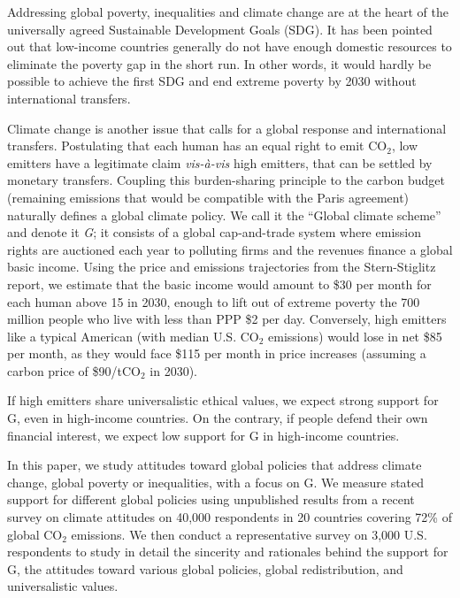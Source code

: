 \documentclass{nature}
\begin{document}
Addressing global poverty, inequalities and climate change are at the heart of the universally agreed Sustainable Development Goals (SDG). %
It has been pointed out that low-income countries generally do not have enough domestic resources to eliminate the poverty gap in the short run.\cite{bolch_arithmetics_2022} In other words, it would hardly be possible to achieve the first SDG and end extreme poverty by 2030 without international transfers. 

Climate change is another issue that calls for a global response and international transfers. Postulating %
that each human has an equal right to emit CO$_\text{2}$, low emitters have a legitimate claim \textit{vis-à-vis} high emitters, that can be settled by monetary transfers. Coupling this burden-sharing principle to the carbon budget (remaining emissions that would be compatible with the Paris agreement) naturally defines a global climate policy. We call it the ``Global climate scheme'' and denote it \textit{G}; it consists of a global cap-and-trade system where emission rights are auctioned each year to polluting firms and the revenues finance a global basic income. Using the price and emissions trajectories from the Stern-Stiglitz report,\cite{stern_report_2017} we estimate that the basic income would amount to \$30 per month for each human above 15 in 2030, enough to lift out of extreme poverty the 700 million people who live with less than PPP \$2 per day. Conversely, high emitters like a typical American (with median U.S. CO$_\text{2}$ emissions) would lose in net \$85 per month, as they would face \$115 per month in price increases (assuming a carbon price of \$90/tCO$_\text{2}$ in 2030).

If high emitters share universalistic ethical values, we expect strong support for G, even in high-income countries. On the contrary, if people defend their own financial interest, we expect low support for G in high-income countries. 

In this paper, we study attitudes toward global policies that address climate change, global poverty or inequalities, with a focus on G. We measure stated support for different global policies using unpublished results from a recent survey\cite{dechezlepretre_fighting_2022-1} on climate attitudes on 40,000 respondents in 20 countries covering 72\% of global CO$_\text{2}$ emissions. We then conduct a representative survey on 3,000 U.S. respondents to study in detail the sincerity and rationales behind the support for G, the attitudes toward various global policies, global redistribution, and universalistic values.
\end{document}

